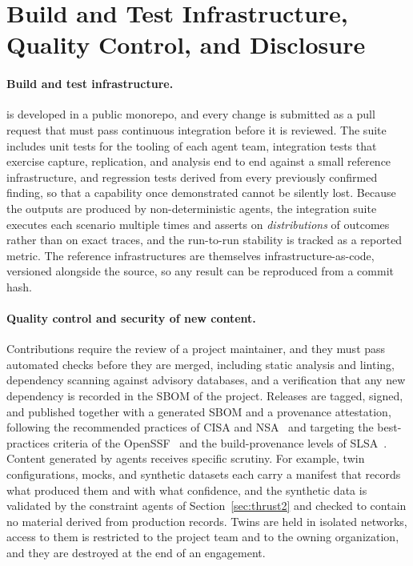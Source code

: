 \section{Build and Test Infrastructure, Quality Control, and Disclosure}
\label{sec:buildtest}

\paragraph{Build and test infrastructure.}
\sysname is developed in a public monorepo, and every change is submitted as a
pull request that must pass continuous integration before it is reviewed. The
suite includes unit tests for the tooling of each agent team, integration
tests that exercise capture, replication, and analysis end to end against a
small reference infrastructure, and regression tests derived from every
previously confirmed finding, so that a capability once demonstrated cannot
be silently lost. Because the outputs are produced by non-deterministic
agents, the integration suite executes each scenario multiple times and
asserts on \emph{distributions} of outcomes rather than on exact traces, and
the run-to-run stability is tracked as a reported metric. The reference
infrastructures are themselves infrastructure-as-code, versioned alongside the source, so any result can be reproduced from a
commit hash.

\paragraph{Quality control and security of new content.}
Contributions require the review of a project maintainer, and they must pass
automated checks before they are merged, including static analysis and
linting, dependency scanning against advisory databases, and a verification
that any new dependency is recorded in the SBOM of the project. Releases are
tagged, signed, and published together with a generated SBOM and a provenance
attestation, following the recommended practices of CISA and NSA~\cite{cisansa}
and targeting the best-practices criteria of the OpenSSF~\cite{openssf} and
the build-provenance levels of SLSA~\cite{slsa}. Content generated by agents receives specific scrutiny. For example, twin
configurations, mocks, and synthetic datasets each carry a manifest that
records what produced them and with what confidence, and the synthetic data
is validated by the constraint agents of Section~\ref{sec:thrust2} and
checked to contain no material derived from production records. Twins are
held in isolated networks, access to them is restricted to the project team
and to the owning organization, and they are destroyed at the end of an
engagement.

